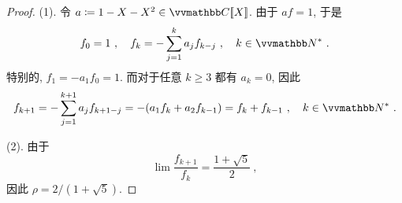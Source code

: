 \begin{proof}
    (1). 令 \(a \coloneqq 1 - X - X^2 \in \C[\![X]\!]\). 由于 \(a f = 1\), 于是
    \[
        f_0 = 1\ ,\quad f_k = - \sum_{j = 1}^k a_j f_{k - j}\ ,\quad k \in \N^\ast\ .
    \]
    特别的, \(f_1 = - a_1 f_0 = 1\). 而对于任意 \(k \geq 3\) 都有 \(a_k = 0\), 因此
    \[
        f_{k + 1} = - \sum_{j = 1}^{k + 1} a_j f_{k + 1 - j} = - (a_1 f_k + a_2 f_{k - 1}) = f_k + f_{k - 1}\ ,\quad k \in \N^\ast\ .
    \]

    (2). 由于
    \[
        \lim \frac{f_{k + 1}}{f_k} = \frac{1 + \sqrt{5}}{2}\ ,
    \]
    因此 \(\rho = 2 / (1 + \sqrt{5})\).
\end{proof}